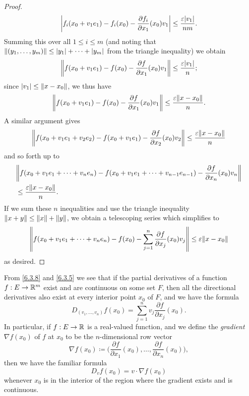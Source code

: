 \begin{proof}
  \[
    \abs{f_i(x_0 + v_1 e_1) - f_i(x_0) - \dfrac{\partial f_i}{\partial x_1}(x_0) v_1} \leq \dfrac{\varepsilon \abs{v_1}}{nm}.
  \]
  Summing this over all \(1 \leq i \leq m\) (and noting that \(\norm*{(y_1, \dots, y_m)} \leq \abs{y_1} + \dots + \abs{y_m}\) from the triangle inequality) we obtain
  \[
    \norm*{f(x_0 + v_1 e_1) - f(x_0) - \dfrac{\partial f}{\partial x_1}(x_0) v_1} \leq \dfrac{\varepsilon \abs{v_1}}{n};
  \]
  since \(\abs{v_1} \leq \norm*{x - x_0}\), we thus have
  \[
    \norm*{f(x_0 + v_1 e_1) - f(x_0) - \dfrac{\partial f}{\partial x_1}(x_0) v_1} \leq \dfrac{\varepsilon \norm*{x - x_0}}{n}.
  \]
  A similar argument gives
  \[
    \norm*{f(x_0 + v_1 e_1 + v_2 e_2) - f(x_0 + v_1 e_1) - \dfrac{\partial f}{\partial x_2}(x_0) v_2} \leq \dfrac{\varepsilon \norm*{x - x_0}}{n}
  \]
  and so forth up to
  \begin{align*}
     & \norm*{f(x_0 + v_1 e_1 + \dots + v_n e_n) - f(x_0 + v_1 e_1 + \dots + v_{n - 1} e_{n - 1}) - \dfrac{\partial f}{\partial x_n}(x_0) v_n} \\
     & \leq \dfrac{\varepsilon \norm*{x - x_0}}{n}.
  \end{align*}
  If we sum these \(n\) inequalities and use the triangle inequality \(\norm*{x + y} \leq \norm*{x} + \norm*{y}\), we obtain a telescoping series which simplifies to
  \[
    \norm*{f(x_0 + v_1 e_1 + \dots + v_n e_n) - f(x_0) - \sum_{j = 1}^n \dfrac{\partial f}{\partial x_j}(x_0) v_j} \leq \varepsilon \norm*{x - x_0}
  \]
  as desired.
\end{proof}

\begin{ac}\label{ac:6.3.3}
  From \cref{6.3.8} and \cref{6.3.5} we see that if the partial derivatives of a function \(f : E \to \R^m\) exist and are continuous on some set \(F\), then all the directional derivatives also exist at every interior point \(x_0\) of \(F\), and we have the formula
  \[
    D_{(v_1, \dots, v_n)} f(x_0) = \sum_{j = 1}^n v_j \dfrac{\partial f}{\partial x_j}(x_0).
  \]
  In particular, if \(f : E \to \R\) is a real-valued function, and we define the \emph{gradient} \(\nabla f(x_0)\) of \(f\) at \(x_0\) to be the \(n\)-dimensional row vector
  \[
    \nabla f(x_0) \coloneqq \bigg(\dfrac{\partial f}{\partial x_1}(x_0), \dots, \dfrac{\partial f}{\partial x_n}(x_0)\bigg),
  \]
  then we have the familiar formula
  \[
    D_v f(x_0) = v \cdot \nabla f(x_0)
  \]
  whenever \(x_0\) is in the interior of the region where the gradient exists and is continuous.
\end{ac}

